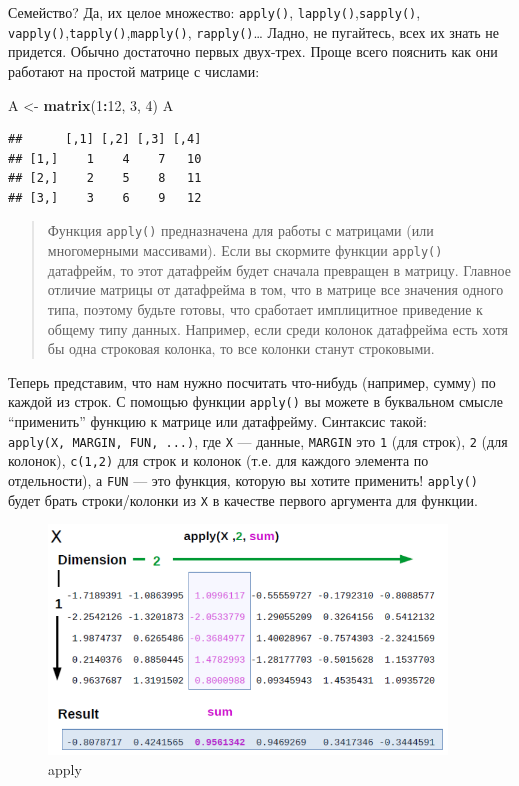 \documentclass[
]{book}
\newenvironment{Shaded}{\begin{snugshade}}{\end{snugshade}}
\newcommand{\DecValTok}[1]{\textcolor[rgb]{0.00,0.00,0.81}{#1}}
\newcommand{\KeywordTok}[1]{\textcolor[rgb]{0.13,0.29,0.53}{\textbf{#1}}}
\newcommand{\NormalTok}[1]{#1}
\newcommand{\OperatorTok}[1]{\textcolor[rgb]{0.81,0.36,0.00}{\textbf{#1}}}
\newcommand{\StringTok}[1]{\textcolor[rgb]{0.31,0.60,0.02}{#1}}
\begin{document}
Семейство? Да, их целое множество: \texttt{apply()}, \texttt{lapply()},\texttt{sapply()}, \texttt{vapply()},\texttt{tapply()},\texttt{mapply()}, \texttt{rapply()}\ldots{} Ладно, не пугайтесь, всех их знать не придется. Обычно достаточно первых двух-трех. Проще всего пояснить как они работают на простой матрице с числами:

\begin{Shaded}
\begin{Highlighting}[]
\NormalTok{A <-}\StringTok{ }\KeywordTok{matrix}\NormalTok{(}\DecValTok{1}\OperatorTok{:}\DecValTok{12}\NormalTok{, }\DecValTok{3}\NormalTok{, }\DecValTok{4}\NormalTok{)}
\NormalTok{A }
\end{Highlighting}
\end{Shaded}

\begin{verbatim}
##      [,1] [,2] [,3] [,4]
## [1,]    1    4    7   10
## [2,]    2    5    8   11
## [3,]    3    6    9   12
\end{verbatim}

\begin{quote}
Функция \texttt{apply()} предназначена для работы с матрицами (или многомерными массивами). Если вы скормите функции \texttt{apply()} датафрейм, то этот датафрейм будет сначала превращен в матрицу. Главное отличие матрицы от датафрейма в том, что в матрице все значения одного типа, поэтому будьте готовы, что сработает имплицитное приведение к общему типу данных. Например, если среди колонок датафрейма есть хотя бы одна строковая колонка, то все колонки станут строковыми.
\end{quote}

Теперь представим, что нам нужно посчитать что-нибудь (например, сумму) по каждой из строк. С помощью функции \texttt{apply()} вы можете в буквальном смысле ``применить'' функцию к матрице или датафрейму. Синтаксис такой: \texttt{apply(X,\ MARGIN,\ FUN,\ ...)}, где \texttt{X} --- данные, \texttt{MARGIN} это \texttt{1} (для строк), \texttt{2} (для колонок), \texttt{c(1,2)} для строк и колонок (т.е. для каждого элемента по отдельности), а \texttt{FUN} --- это функция, которую вы хотите применить! \texttt{apply()} будет брать строки/колонки из \texttt{X} в качестве первого аргумента для функции.

\begin{figure}
\centering
\includegraphics[width=4.16667in,height=\textheight]{images/Apply_function.png}
\caption{apply}
\end{figure}
\end{document}
